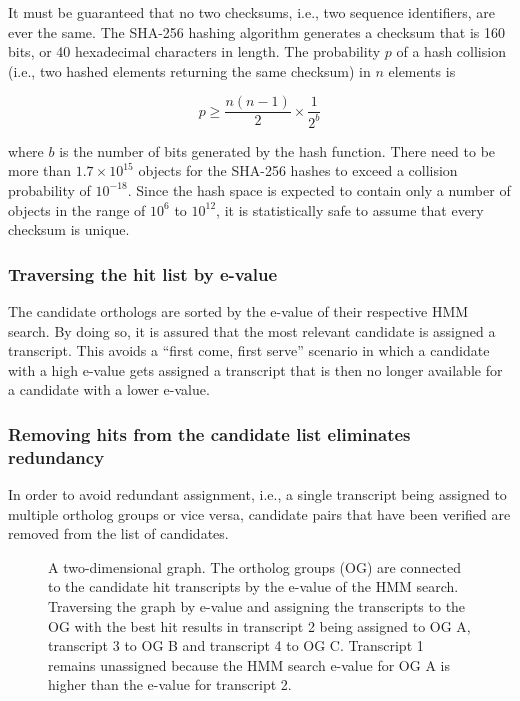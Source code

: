 It must be guaranteed that no two checksums, i.e., two sequence identifiers, are
ever the same. The SHA-256 hashing algorithm generates a checksum that is 160 bits,
or 40 hexadecimal characters in length. The probability $p$ of a hash collision
(i.e., two hashed elements returning the same checksum) in $n$ elements is

\begin{equation}
p \ge \frac{n (n-1)}{2} \times \frac{1}{2^b}
\label{eq:hashcollision}
\end{equation}

where $b$ is the number of bits generated by the hash function. There need to be
more than $1.7 \times 10^{15}$ objects for the SHA-256 hashes to exceed a collision
probability of $10^{-18}$. Since the hash space is expected to contain only a
number of objects in the range of $10^6$ to $10^{12}$, it is statistically safe
to assume that every checksum is unique. 

\subsubsection{Traversing the hit list by e-value}

The candidate orthologs are sorted by the e-value of their respective HMM
search. By doing so, it is assured that the most relevant candidate is assigned
a transcript. This avoids a ``first come, first serve'' scenario in which a
candidate with a high e-value gets assigned a transcript that is then no longer
available for a candidate with a lower e-value.

\subsubsection{Removing hits from the candidate list eliminates redundancy}

In order to avoid redundant assignment, i.e., a single transcript being assigned
to multiple ortholog groups or vice versa, candidate pairs that have been
verified are removed from the list of candidates. 

\begin{figure}[ht]
	\begin{center}
	\end{center}
	\caption{A two-dimensional graph. The ortholog groups (OG) are connected to the
	candidate hit transcripts by the e-value of the HMM search. Traversing the graph
	by e-value and assigning the transcripts to the OG with the best
	hit results in transcript 2 being assigned to OG A, transcript 3 to OG B and
	transcript 4 to OG C. Transcript 1 remains unassigned because the HMM search
	e-value for OG A is higher than the e-value for transcript 2.}
	\label{fig:graph}
\end{figure}
